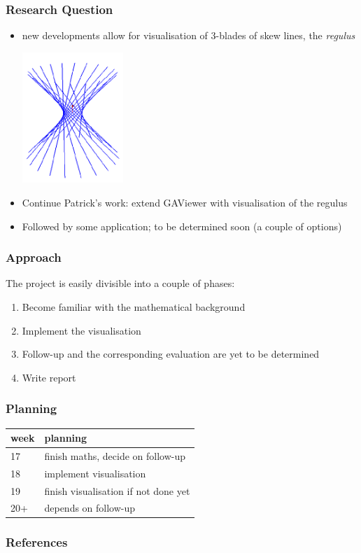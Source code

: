 \documentclass{beamer}
\begin{document}
  \begin{frame}
    \frametitle{Research Question}
    \begin{itemize}
      \item new developments allow for visualisation of 3-blades of skew lines,
        the \emph{regulus}
        \begin{center}
          \includegraphics[width=0.3\textwidth]{regulus.png}
        \end{center}
      \item Continue Patrick's work: extend GAViewer with visualisation of the
        regulus
      \item Followed by some application; to be determined soon (a couple of
        options)
    \end{itemize}
  \end{frame}

  \begin{frame}
    \frametitle{Approach}
    The project is easily divisible into a couple of phases:
    \begin{enumerate}
      \item Become familiar with the mathematical background
      \item Implement the visualisation
      \item Follow-up and the corresponding evaluation are yet to be determined
      \item Write report
    \end{enumerate}
  \end{frame}

  \begin{frame}
    \frametitle{Planning}
    \begin{table}
      \begin{tabular}{| l | l |}
        \hline
        week & planning \\
        \hline
        17   & finish maths, decide on follow-up \\
        18   & implement visualisation \\
        19   & finish visualisation if not done yet \\
        20+  & depends on follow-up \\
        \hline
      \end{tabular}
    \end{table}
  \end{frame}


\begin{frame}
  \frametitle{References}
  
\end{frame}
\end{document}
